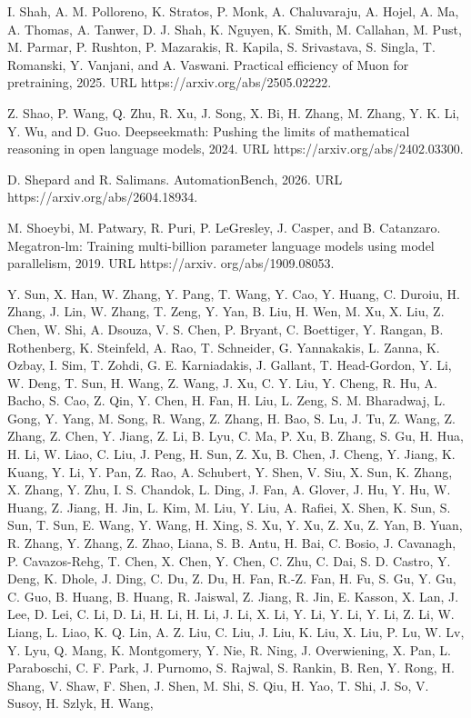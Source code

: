 \documentclass[
  10
]{article}
\begin{document}
I. Shah, A. M. Polloreno, K. Stratos, P. Monk, A. Chaluvaraju, A. Hojel,
A. Ma, A. Thomas, A. Tanwer, D. J. Shah, K. Nguyen, K. Smith, M.
Callahan, M. Pust, M. Parmar, P. Rushton, P. Mazarakis, R. Kapila, S.
Srivastava, S. Singla, T. Romanski, Y. Vanjani, and A. Vaswani.
Practical efficiency of Muon for pretraining, 2025. URL
https://arxiv.org/abs/2505.02222.

Z. Shao, P. Wang, Q. Zhu, R. Xu, J. Song, X. Bi, H. Zhang, M. Zhang, Y.
K. Li, Y. Wu, and D. Guo. Deepseekmath: Pushing the limits of
mathematical reasoning in open language models, 2024. URL
https://arxiv.org/abs/2402.03300.

D. Shepard and R. Salimans. AutomationBench, 2026. URL
https://arxiv.org/abs/2604.18934.

M. Shoeybi, M. Patwary, R. Puri, P. LeGresley, J. Casper, and B.
Catanzaro. Megatron-lm: Training multi-billion parameter language models
using model parallelism, 2019. URL https://arxiv. org/abs/1909.08053.

Y. Sun, X. Han, W. Zhang, Y. Pang, T. Wang, Y. Cao, Y. Huang, C. Duroiu,
H. Zhang, J. Lin, W. Zhang, T. Zeng, Y. Yan, B. Liu, H. Wen, M. Xu, X.
Liu, Z. Chen, W. Shi, A. Dsouza, V. S. Chen, P. Bryant, C. Boettiger, Y.
Rangan, B. Rothenberg, K. Steinfeld, A. Rao, T. Schneider, G.
Yannakakis, L. Zanna, K. Ozbay, I. Sim, T. Zohdi, G. E. Karniadakis, J.
Gallant, T. Head-Gordon, Y. Li, W. Deng, T. Sun, H. Wang, Z. Wang, J.
Xu, C. Y. Liu, Y. Cheng, R. Hu, A. Bacho, S. Cao, Z. Qin, Y. Chen, H.
Fan, H. Liu, L. Zeng, S. M. Bharadwaj, L. Gong, Y. Yang, M. Song, R.
Wang, Z. Zhang, H. Bao, S. Lu, J. Tu, Z. Wang, Z. Zhang, Z. Chen, Y.
Jiang, Z. Li, B. Lyu, C. Ma, P. Xu, B. Zhang, S. Gu, H. Hua, H. Li, W.
Liao, C. Liu, J. Peng, H. Sun, Z. Xu, B. Chen, J. Cheng, Y. Jiang, K.
Kuang, Y. Li, Y. Pan, Z. Rao, A. Schubert, Y. Shen, V. Siu, X. Sun, K.
Zhang, X. Zhang, Y. Zhu, I. S. Chandok, L. Ding, J. Fan, A. Glover, J.
Hu, Y. Hu, W. Huang, Z. Jiang, H. Jin, L. Kim, M. Liu, Y. Liu, A.
Rafiei, X. Shen, K. Sun, S. Sun, T. Sun, E. Wang, Y. Wang, H. Xing, S.
Xu, Y. Xu, Z. Xu, Z. Yan, B. Yuan, R. Zhang, Y. Zhang, Z. Zhao, Liana,
S. B. Antu, H. Bai, C. Bosio, J. Cavanagh, P. Cavazos-Rehg, T. Chen, X.
Chen, Y. Chen, C. Zhu, C. Dai, S. D. Castro, Y. Deng, K. Dhole, J. Ding,
C. Du, Z. Du, H. Fan, R.-Z. Fan, H. Fu, S. Gu, Y. Gu, C. Guo, B. Huang,
B. Huang, R. Jaiswal, Z. Jiang, R. Jin, E. Kasson, X. Lan, J. Lee, D.
Lei, C. Li, D. Li, H. Li, H. Li, J. Li, X. Li, Y. Li, Y. Li, Y. Li, Z.
Li, W. Liang, L. Liao, K. Q. Lin, A. Z. Liu, C. Liu, J. Liu, K. Liu, X.
Liu, P. Lu, W. Lv, Y. Lyu, Q. Mang, K. Montgomery, Y. Nie, R. Ning, J.
Overwiening, X. Pan, L. Paraboschi, C. F. Park, J. Purnomo, S. Rajwal,
S. Rankin, B. Ren, Y. Rong, H. Shang, V. Shaw, F. Shen, J. Shen, M. Shi,
S. Qiu, H. Yao, T. Shi, J. So, V. Susoy, H. Szlyk, H. Wang,
\end{document}
